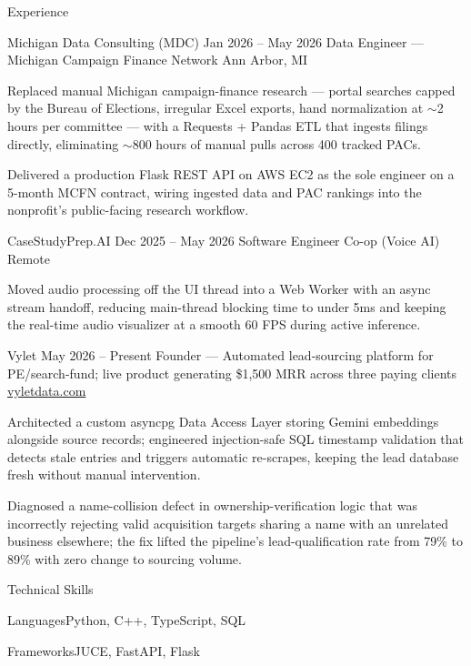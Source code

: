 \documentclass[
	11pt
]{../../../template}
\begin{document}
	\begin{rSection}{E}{xperience}
		\begin{rSectionEntry}
			{Michigan Data Consulting (MDC)}
			{Jan 2026 -- May 2026}
			{Data Engineer --- Michigan Campaign Finance Network}
			{}
			{Ann Arbor, MI}

			\item Replaced manual Michigan campaign-finance research --- portal searches capped by the Bureau of Elections, irregular Excel exports, hand normalization at $\sim$2 hours per committee --- with a Requests + Pandas ETL that ingests filings directly, eliminating $\sim$800 hours of manual pulls across 400 tracked PACs.
			\item Delivered a production Flask REST API on AWS EC2 as the sole engineer on a 5-month MCFN contract, wiring ingested data and PAC rankings into the nonprofit's public-facing research workflow.
		\end{rSectionEntry}

		\begin{rSectionEntry}
			{CaseStudyPrep.AI}
			{Dec 2025 -- May 2026}
			{Software Engineer Co-op (Voice AI)}
			{}
			{Remote}

			\item Moved audio processing off the UI thread into a Web Worker with an async stream handoff, reducing main-thread blocking time to under 5ms and keeping the real-time audio visualizer at a smooth 60 FPS during active inference.
		\end{rSectionEntry}

		\begin{rSectionEntry}
			{Vylet}
			{May 2026 -- Present}
			{Founder --- Automated lead-sourcing platform for PE/search-fund; live product generating \$1,500 MRR across three paying clients}
			{}
			{\href{https://vyletdata.com}{vyletdata.com}}

			\item Architected a custom asyncpg Data Access Layer storing Gemini embeddings alongside source records; engineered injection-safe SQL timestamp validation that detects stale entries and triggers automatic re-scrapes, keeping the lead database fresh without manual intervention.
			\item Diagnosed a name-collision defect in ownership-verification logic that was incorrectly rejecting valid acquisition targets sharing a name with an unrelated business elsewhere; the fix lifted the pipeline's lead-qualification rate from 79\% to 89\% with zero change to sourcing volume.
		\end{rSectionEntry}
	\end{rSection}

	\begin{rSection}{T}{echnical Skills}
		\begin{rSet}{Languages}{Python, C++, TypeScript, SQL}
		\end{rSet}
		\begin{rSet}{Frameworks}{JUCE, FastAPI, Flask}
		\end{rSet}
	\end{rSection}
\end{document}
